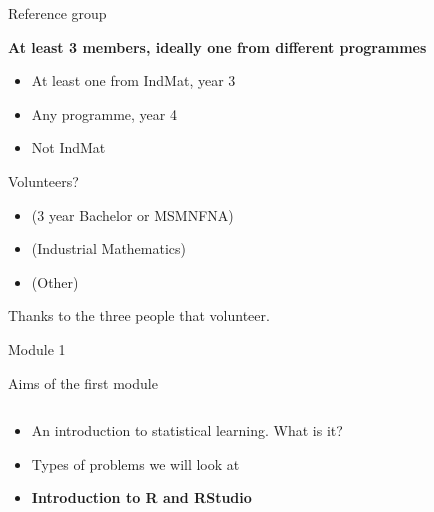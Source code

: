 \documentclass[10pt,ignorenonframetext,]{beamer}
\providecommand{\tightlist}{%
  \setlength{\itemsep}{0pt}\setlength{\parskip}{0pt}}
\begin{document}
\begin{frame}{Reference group}
\protect\hypertarget{reference-group}{}

\textbf{At least 3 members, ideally one from different programmes}

\begin{itemize}
\tightlist
\item
  At least one from IndMat, year 3
\item
  Any programme, year 4
\item
  Not IndMat
\end{itemize}

Volunteers?

\begin{itemize}
\tightlist
\item
  (3 year Bachelor or MSMNFNA)
\item
  (Industrial Mathematics)
\item
  (Other)
\end{itemize}

Thanks to the three people that volunteer.

\end{frame}

\begin{frame}{Module 1}
\protect\hypertarget{module-1}{}

\begin{block}{Aims of the first module}

\(~\)

\begin{itemize}
\tightlist
\item
  An introduction to statistical learning. What is it?
\end{itemize}

\vspace{2mm}

\begin{itemize}
\tightlist
\item
  Types of problems we will look at
\end{itemize}

\vspace{2mm}

\begin{itemize}
\tightlist
\item
  \textbf{Introduction to R and RStudio }
\end{itemize}

\end{block}

\end{frame}
\end{document}
